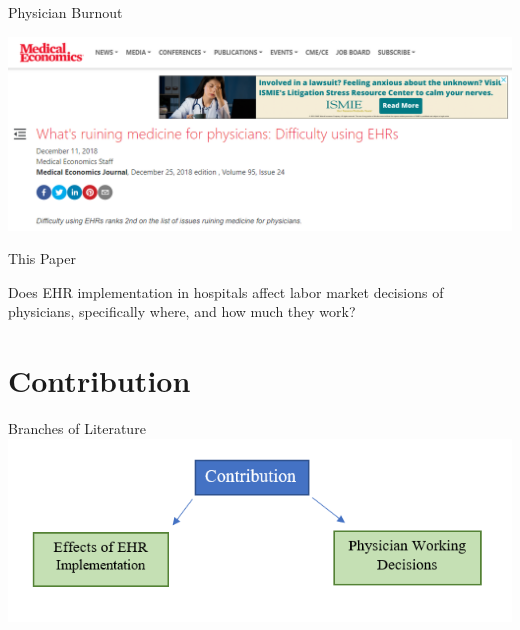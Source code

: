 \documentclass[10pt]{beamer}
\begin{document}
\begin{frame}[noframenumbering]{Physician Burnout}
\begin{center}
    \includegraphics[scale=.45]{graphics/News Clip3.PNG}
\end{center}
\end{frame}

\begin{frame}{This Paper}

Does EHR implementation in hospitals affect labor market decisions of physicians, specifically where, and how much they work?
    
\end{frame}


\section{Contribution}

\begin{frame}{Branches of Literature}
\centering
\includegraphics[scale=.5]{graphics/Contribution_litgraphic.PNG}

\end{frame}
\end{document}
